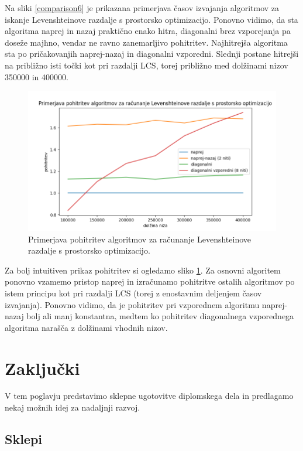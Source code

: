 \documentclass[a4paper,12pt,openright]{book}
\begin{document}
Na sliki \ref{comparison6} je prikazana primerjava časov izvajanja algoritmov za iskanje Levenshteinove razdalje s prostorsko optimizacijo. Ponovno vidimo, da sta algoritma naprej in nazaj praktično enako hitra, diagonalni brez vzporejanja pa doseže majhno, vendar ne ravno zanemarljivo pohitritev. Najhitrejša algoritma sta po pričakovanjih naprej-nazaj in diagonalni vzporedni. Slednji postane hitrejši na približno isti točki kot pri razdalji LCS, torej približno med dolžinami nizov 350000 in 400000. 

\begin{figure}[htb]
\centering
\includegraphics[width=1.0\textwidth]{plots/LevenshteinAcceleration.png}
\caption{Primerjava pohitritev algoritmov za računanje Levenshteinove razdalje s prostorsko optimizacijo.}
\label{comparison61}
\end{figure}

Za bolj intuitiven prikaz pohitritev si ogledamo sliko \ref{comparison61}. Za osnovni algoritem ponovno vzamemo pristop naprej in izračunamo pohitritve ostalih algoritmov po istem principu kot pri razdalji LCS (torej z enostavnim deljenjem časov izvajanja). Ponovno vidimo, da je pohitritev pri vzporednem algoritmu naprej-nazaj bolj ali manj konstantna, medtem ko pohitritev diagonalnega vzporednega algoritma narašča z dolžinami vhodnih nizov. 

\chapter{Zaključki}

V tem poglavju predstavimo sklepne ugotovitve diplomskega dela in predlagamo nekaj možnih idej za nadaljnji razvoj.

\section{Sklepi}
\end{document}
